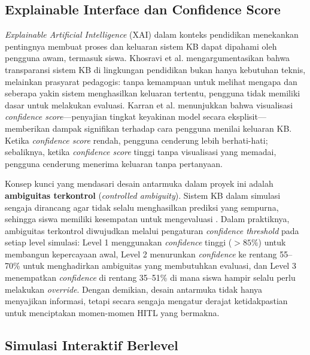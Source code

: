 \documentclass[12pt,a4paper,oneside,openany]{report}
\begin{document}
\subsection{Explainable Interface dan Confidence Score}
\label{subsec:explainable-interface}

\textit{Explainable Artificial Intelligence} (XAI) dalam konteks pendidikan menekankan pentingnya membuat proses dan keluaran sistem KB dapat dipahami oleh pengguna awam, termasuk siswa. Khosravi et al. \cite{ref3} mengargumentasikan bahwa transparansi sistem KB di lingkungan pendidikan bukan hanya kebutuhan teknis, melainkan prasyarat pedagogis: tanpa kemampuan untuk melihat mengapa dan seberapa yakin sistem menghasilkan keluaran tertentu, pengguna tidak memiliki dasar untuk melakukan evaluasi. Karran et al. \cite{ref8} menunjukkan bahwa visualisasi \textit{confidence score}---penyajian tingkat keyakinan model secara eksplisit---memberikan dampak signifikan terhadap cara pengguna menilai keluaran KB. Ketika \textit{confidence score} rendah, pengguna cenderung lebih berhati-hati; sebaliknya, ketika \textit{confidence score} tinggi tanpa visualisasi yang memadai, pengguna cenderung menerima keluaran tanpa pertanyaan.

Konsep kunci yang mendasari desain antarmuka dalam proyek ini adalah \textbf{ambiguitas terkontrol} (\textit{controlled ambiguity}). Sistem KB dalam simulasi sengaja dirancang agar tidak selalu menghasilkan prediksi yang sempurna, sehingga siswa memiliki kesempatan untuk mengevaluasi \cite{ref3}. Dalam praktiknya, ambiguitas terkontrol diwujudkan melalui pengaturan \textit{confidence threshold} pada setiap level simulasi: Level 1 menggunakan \textit{confidence} tinggi ($>85\%$) untuk membangun kepercayaan awal, Level 2 menurunkan \textit{confidence} ke rentang 55--70\% untuk menghadirkan ambiguitas yang membutuhkan evaluasi, dan Level 3 menempatkan \textit{confidence} di rentang 35--51\% di mana siswa hampir selalu perlu melakukan \textit{override}. Dengan demikian, desain antarmuka tidak hanya menyajikan informasi, tetapi secara sengaja mengatur derajat ketidakpastian untuk menciptakan momen-momen HITL yang bermakna.

\subsection{Simulasi Interaktif Berlevel}
\label{subsec:simulasi-interaktif}
\end{document}
